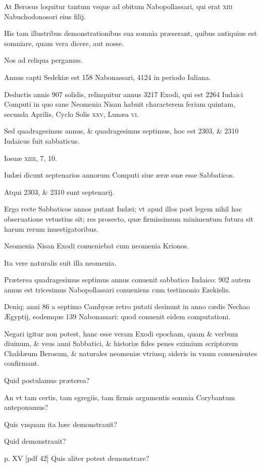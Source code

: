 \begin{parnumbers}
At Berosus loquitur tantum vsque ad obitum
Nabopollassari, qui erat \textsc{xiii} Nabuchodonosori eius filij.

His tam illustribus demonstrationibus sua somnia præserant, quibus antiquius
est somniare, quam vera dicere, aut nosse.

Nos ad reliqua
pergamus.

Annus capti Sedekiæ est 158 Nabonassari, 4124 in periodo Iuliana.

Deductis annis 907 solidis, relinquitur annus 3217
Exodi, qui est 2264 Iudaici Computi in quo sane Neomenia Nisan
habuit characterem feriam quintam, secunda Aprilis, Cyclo
Solis \textsc{xxv}, Lunæa \textsc{vi}.

Sed quadragesimus annus, \& quadragesimus
septimus, hoc est 2303, \& 2310 Iudaicus fuit sabbaticus.

Iosuæ
\textsc{xiiii}, 7, 10.

Iudæi dicunt septenarios annorum Computi siue æræ
suæ esse Sabbaticos.

Atqui 2303, \& 2310 sunt septenarij.

Ergo recte
Sabbaticos annos putant Iudæi; vt apud illos post legem nihil
hac obseruatione vetustius sit; res prosecto, quæ firmissimum
minimentum futura sit harum rerum inuestigatoribus.

Neomenia Nisan Exodi conueniebat cum neomenia Krionos.

Ita vere naturalis suit illa neomenia.

Præterea quadragesimus septimus
annus conuenit sabbatico Iudaico: 902 autem annus est tricesimus
Nabopollassari conueniens cum testimonio Ezekielis.

Deniq; anni 86 a septimo Cambysæ retro putati desinunt in anno
cædis Nechao Ægyptij, eodemque 139 Nabonassari: quod conuenit
eidem computationi.

Negari igitur non potest, hanc esse veram
Exodi epocham, quam \& verbum diuinum, \& vsus anni Sabbatici,
\& historiæ fides penes eximium scriptorem Chaldæum
Berosum, \& naturales neomeniæ vtriusq; sideris in vnum conuenientes
confirmant.

Quid postulamus præterea?

An vt tam certis,
tam egregiis, tam firmis argumentis somnia Corybantum anteponamus?

Quis vnquam ita hæc demonstrauit?

Quid demonstrauit?

\clearpage
p. XV [pdf 42]
Quis aliter potest demonstrare?


\end{parnumbers}
